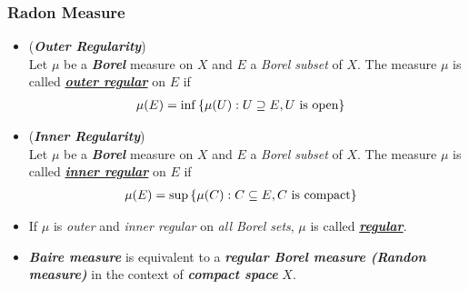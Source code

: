 \documentclass[11pt]{article}
\begin{document}
\subsubsection{Radon Measure}
\begin{itemize}
\item \begin{definition} (\emph{\textbf{Outer Regularity}}) \citep{folland2013real} \\
Let $\mu$ be a \textbf{\emph{Borel}} measure on $X$ and $E$ a \emph{Borel subset} of $X$. The measure $\mu$ is called \underline{\textbf{\emph{outer regular}}} on $E$  if
\begin{align*}
\mu(E) &= \inf\left\{\mu(U): U \supseteq E, U \text{ is open}\right\}
\end{align*}
\end{definition}

\item \begin{definition} (\emph{\textbf{Inner Regularity}}) \citep{folland2013real} \\
Let $\mu$ be a \textbf{\emph{Borel}} measure on $X$ and $E$ a \emph{Borel subset} of $X$. The measure $\mu$ is called \underline{\textbf{\emph{inner regular}}} on $E$  if
\begin{align*}
\mu(E) &= \sup\left\{\mu(C): C \subseteq E, C \text{ is compact}\right\}
\end{align*}
\end{definition}

\item \begin{definition}
If $\mu$ is \emph{outer} and \emph{inner regular} on \emph{all Borel sets}, $\mu$ is called \underline{\textbf{\emph{regular}}}. 
\end{definition}

\item \begin{remark}
\emph{\textbf{Baire measure}} is equivalent to a \emph{\textbf{regular Borel measure (Randon measure)}} in the context of \emph{\textbf{compact space}} $X$.
\end{remark}


\end{itemize}
\end{document}
